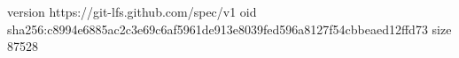version https://git-lfs.github.com/spec/v1
oid sha256:c8994e6885ac2c3e69c6af5961de913e8039fed596a8127f54cbbeaed12ffd73
size 87528
